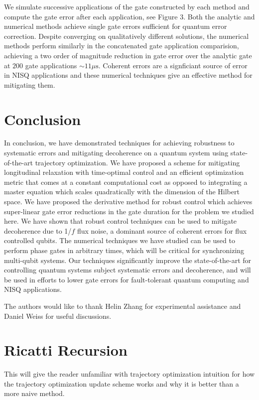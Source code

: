 \documentclass[
  amsfonts,
  amsmath,
  tbtags,
  amssymb,
  aps,
  nobibnotes,
  twocolumn,
  superscriptaddress,
]{revtex4-2}
\begin{document}
We simulate successive applications of the gate constructed by each method and compute the gate error
after each application, see Figure 3. Both the analytic and numerical methods achieve single gate errors
sufficient for quantum error correction. Despite converging on qualitatively different solutions, the
numerical methods perform similarly in the concatenated gate application comparision, achieving a two
order of magnitude reduction in gate error over the analytic gate at $200$
gate applications $\sim 11 \mu\textrm{s}$.
Coherent errors are a signficiant source of error in NISQ applications and these numerical techniques give
an effective method for mitigating them.

\section{Conclusion}
In conclusion, we have demonstrated techniques for achieving robustness to systematic
errors and mitigating decoherence on a quantum system using state-of-the-art trajectory
optimization. We have proposed a scheme for mitigating longitudinal relaxation with time-optimal
control and an efficient optimization metric that comes at a constant computational cost as
opposed to integrating a master equation which scales quadratically with
the dimension of the Hilbert space.
We have proposed the derivative method for robust control which achieves
super-linear gate error reductions in the gate duration for the problem we studied here.
We have shown that robust control techniques can be used to mitigate decoherence due
to 1/$f$ flux noise, a dominant source of coherent errors for flux controlled qubits.
The numerical techniques we have studied can be used to perform phase gates in arbitrary times,
which will be critical for synchronizing multi-qubit systems. Our
techniques significantly improve the state-of-the-art for controlling quantum systems subject
systematic errors and decoherence, and will be used in efforts to lower gate errors
for fault-tolerant quantum computing and NISQ applications.


\begin{acknowledgments}
  The authors would like to thank Helin Zhang for experimental assistance
  and Daniel Weiss for useful discussions.
\end{acknowledgments}


\appendix
\section{Ricatti Recursion}
This will give the reader unfamiliar with trajectory
optimization intuition for how the trajectory optimization
update scheme works and why it is better than
a more naive method.
\end{document}
